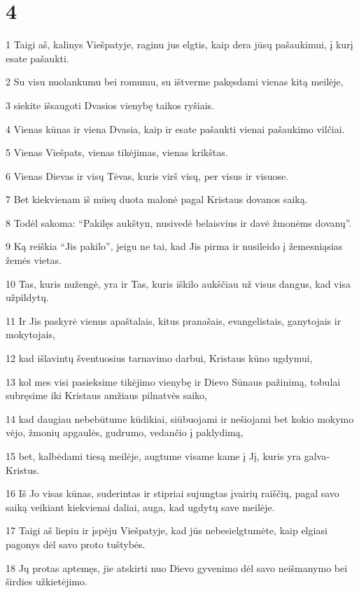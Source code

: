 \chapter{4}


\par 1 Taigi aš, kalinys Viešpatyje, raginu jus elgtis, kaip dera jūsų pašaukimui, į kurį esate pašaukti. 
\par 2 Su visu nuolankumu bei romumu, su ištverme pakęsdami vienas kitą meilėje, 
\par 3 siekite išsaugoti Dvasios vienybę taikos ryšiais. 
\par 4 Vienas kūnas ir viena Dvasia, kaip ir esate pašaukti vienai pašaukimo vilčiai. 
\par 5 Vienas Viešpats, vienas tikėjimas, vienas krikštas. 
\par 6 Vienas Dievas ir visų Tėvas, kuris virš visų, per visus ir visuose. 
\par 7 Bet kiekvienam iš mūsų duota malonė pagal Kristaus dovanos saiką. 
\par 8 Todėl sakoma: “Pakilęs aukštyn, nusivedė belaisvius ir davė žmonėms dovanų”. 
\par 9 Ką reiškia “Jis pakilo”, jeigu ne tai, kad Jis pirma ir nusileido į žemesniąsias žemės vietas. 
\par 10 Tas, kuris nužengė, yra ir Tas, kuris iškilo aukščiau už visus dangus, kad visa užpildytų. 
\par 11 Ir Jis paskyrė vienus apaštalais, kitus pranašais, evangelistais, ganytojais ir mokytojais, 
\par 12 kad išlavintų šventuosius tarnavimo darbui, Kristaus kūno ugdymui, 
\par 13 kol mes visi pasieksime tikėjimo vienybę ir Dievo Sūnaus pažinimą, tobulai subręsime iki Kristaus amžiaus pilnatvės saiko, 
\par 14 kad daugiau nebebūtume kūdikiai, siūbuojami ir nešiojami bet kokio mokymo vėjo, žmonių apgaulės, gudrumo, vedančio į paklydimą, 
\par 15 bet, kalbėdami tiesą meilėje, augtume visame kame į Jį, kuris yra galva­Kristus. 
\par 16 Iš Jo visas kūnas, suderintas ir stipriai sujungtas įvairių raiščių, pagal savo saiką veikiant kiekvienai daliai, auga, kad ugdytų save meilėje. 
\par 17 Taigi aš liepiu ir įspėju Viešpatyje, kad jūs nebesielgtumėte, kaip elgiasi pagonys dėl savo proto tuštybės. 
\par 18 Jų protas aptemęs, jie atskirti nuo Dievo gyvenimo dėl savo neišmanymo bei širdies užkietėjimo. 
